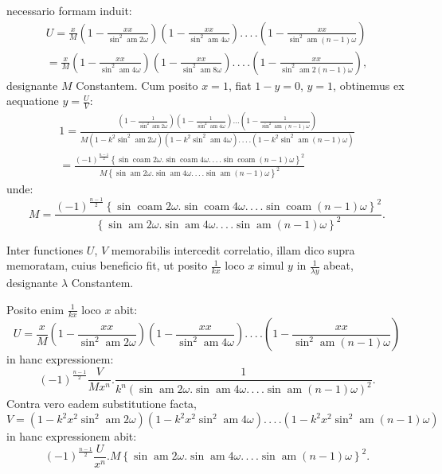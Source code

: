 \documentclass{article}
\begin{document}
necessario formam induit:
\[
\begin{gathered}
U=\frac{x}{M}\left(1-\frac{xx}{\sin^{2}\operatorname{am}2\omega}\right)\left(1-\frac{xx}{\sin^{2}\operatorname{am}4\omega}\right).\,.\,.\,.\left(1-\frac{xx}{\sin^{2}\operatorname{am}(n-1)\omega}\right)\\[1.5ex]
=\frac{x}{M}\left(1-\frac{xx}{\sin^{2}\operatorname{am}4\omega}\right)\left(1-\frac{xx}{\sin^{2}\operatorname{am}8\omega}\right).\,.\,.\,.\left(1-\frac{xx}{\sin^{2}\operatorname{am}2(n-1)\omega}\right),
\end{gathered}
\]
designante $M$ Constantem. Cum posito $x=1$, fiat $1-y=0$, $y=1$, obtinemus ex aequatione $y=\frac{U}{V}$:
\[
\begin{gathered}
1=\frac{\left(1-\frac{1}{\sin^{2}\operatorname{am}2\omega}\right)\left(1-\frac{1}{\sin^{2}\operatorname{am}4\omega}\right)\ldots\left(1-\frac{1}{\sin^{2}\operatorname{am}(n-1)\omega}\right)}{M\left(1-k^{2}\sin^{2}\operatorname{am}2\omega\right)\left(1-k^{2}\sin^{2}\operatorname{am}4\omega\right).\,.\,.\,.\left(1-k^{2}\sin^{2}\operatorname{am}(n-1)\omega\right)}\\[1.5ex]
=\frac{(-1)^{\frac{n-1}{2}}\left\{\sin\operatorname{coam}2\omega.\sin\operatorname{coam}4\omega.\,.\,.\,.\sin\operatorname{coam}(n-1)\omega\right\}^{2}}{M\left\{\sin\operatorname{am}2\omega.\sin\operatorname{am}4\omega.\,.\,.\,.\sin\operatorname{am}(n-1)\omega\right\}^{2}}
\end{gathered}
\]
unde:
\[
M=\frac{(-1)^{\frac{n-1}{2}}\left\{\sin\operatorname{coam}2\omega.\sin\operatorname{coam}4\omega.\,.\,.\,.\sin\operatorname{coam}(n-1)\omega\right\}^{2}}{\left\{\sin\operatorname{am}2\omega.\sin\operatorname{am}4\omega.\,.\,.\,.\sin\operatorname{am}(n-1)\omega\right\}^{2}}.
\]

Inter functiones $U$, $V$ memorabilis intercedit correlatio, illam dico supra memoratam, cuius beneficio fit, ut posito $\frac{1}{kx}$ loco $x$ simul $y$ in $\frac{1}{\lambda y}$ abeat, designante $\lambda$ Constantem.

Posito enim $\frac{1}{kx}$ loco $x$ abit:
\[
U=\frac{x}{M}\left(1-\frac{xx}{\sin^{2}\operatorname{am}2\omega}\right)\left(1-\frac{xx}{\sin^{2}\operatorname{am}4\omega}\right).\,.\,.\,.\left(1-\frac{xx}{\sin^{2}\operatorname{am}(n-1)\omega}\right)
\]
in hanc expressionem:
\[
(-1)^{\frac{n-1}{2}}\frac{V}{Mx^{n}}.\frac{1}{k^{n}\left(\sin\operatorname{am}2\omega.\sin\operatorname{am}4\omega.\,.\,.\,.\sin\operatorname{am}(n-1)\omega\right)^{2}}.
\]
Contra vero eadem substitutione facta,
\[
V=\left(1-k^{2}x^{2}\sin^{2}\operatorname{am}2\omega\right)\left(1-k^{2}x^{2}\sin^{2}\operatorname{am}4\omega\right).\,.\,.\,.\left(1-k^{2}x^{2}\sin^{2}\operatorname{am}(n-1)\omega\right)
\]
in hanc expressionem abit:
\[
(-1)^{\frac{n-1}{2}}\frac{U}{x^{n}}.M\left\{\sin\operatorname{am}2\omega.\sin\operatorname{am}4\omega.\,.\,.\,.\sin\operatorname{am}(n-1)\omega\right\}^{2}.
\]
\end{document}
